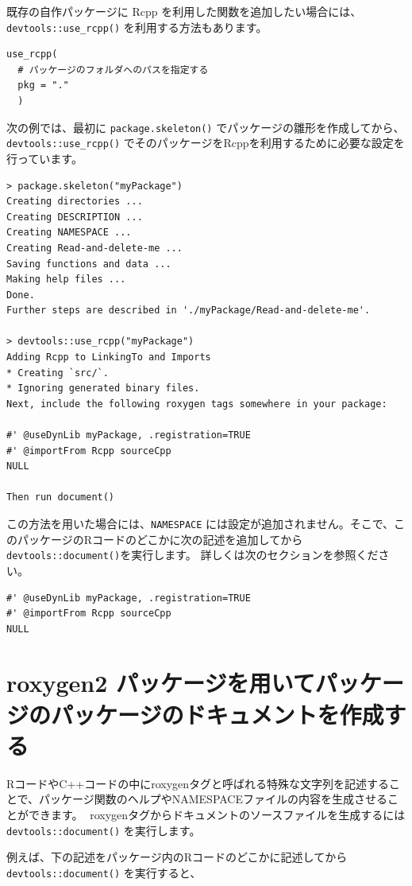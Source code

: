 \documentclass[]{book}
\begin{document}
既存の自作パッケージに Rcpp を利用した関数を追加したい場合には、\texttt{devtools::use\_rcpp()} を利用する方法もあります。

\begin{verbatim}
use_rcpp(
  # パッケージのフォルダへのパスを指定する
  pkg = "." 
  )
\end{verbatim}

次の例では、最初に \texttt{package.skeleton()} でパッケージの雛形を作成してから、\texttt{devtools::use\_rcpp()} でそのパッケージをRcppを利用するために必要な設定を行っています。

\begin{verbatim}
> package.skeleton("myPackage")
Creating directories ...
Creating DESCRIPTION ...
Creating NAMESPACE ...
Creating Read-and-delete-me ...
Saving functions and data ...
Making help files ...
Done.
Further steps are described in './myPackage/Read-and-delete-me'.

> devtools::use_rcpp("myPackage")
Adding Rcpp to LinkingTo and Imports
* Creating `src/`.
* Ignoring generated binary files.
Next, include the following roxygen tags somewhere in your package:

#' @useDynLib myPackage, .registration=TRUE
#' @importFrom Rcpp sourceCpp
NULL

Then run document()
\end{verbatim}

この方法を用いた場合には、\texttt{NAMESPACE} には設定が追加されません。そこで、このパッケージのRコードのどこかに次の記述を追加してから \texttt{devtools::document()}を実行します。
詳しくは次のセクションを参照ください。

\begin{verbatim}
#' @useDynLib myPackage, .registration=TRUE
#' @importFrom Rcpp sourceCpp
NULL
\end{verbatim}

\hypertarget{roxygen2-}{%
\section{roxygen2 パッケージを用いてパッケージのパッケージのドキュメントを作成する}\label{roxygen2-}}

RコードやC++コードの中にroxygenタグと呼ばれる特殊な文字列を記述することで、パッケージ関数のヘルプやNAMESPACEファイルの内容を生成させることができます。

roxygenタグからドキュメントのソースファイルを生成するには \texttt{devtools::document()} を実行します。

例えば、下の記述をパッケージ内のRコードのどこかに記述してから \texttt{devtools::document()} を実行すると、
\end{document}

